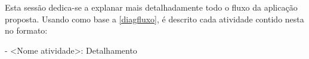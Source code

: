 Esta sessão dedica-se a explanar mais detalhadamente todo o fluxo da aplicação proposta. Usando como base a \autoref{diagfluxo}, é descrito cada atividade contido nesta no formato: 

- <Nome atividade>: Detalhamento
